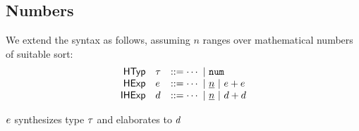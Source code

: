 
\subsection{Numbers}
We extend the syntax as follows, assuming $n$ ranges over mathematical numbers of suitable sort:
\[
\begin{array}{rllllll}
\mathsf{HTyp} & \htau & ::= \cdots ~\vert~ \tnum
\\
\mathsf{HExp} & \hexp & ::= \cdots
~\vert~ \hnum{n}
~\vert~ \hadd{\hexp}{\hexp}
\\
\mathsf{IHExp} & \dexp & ::= \cdots
~\vert~ \dnum{n}
~\vert~ \dadd{\dexp}{\dexp}
\end{array}
\]


\vsepRule

\begin{mathpar}

\end{mathpar}

\vsepRule

\judgbox
  {\elabSyn{\hGamma}{\hexp}{\htau}{\dexp}{\Delta}}
  {$\hexp$ synthesizes type $\htau$ and elaborates to $\dexp$}
\begin{mathpar}


\end{mathpar}

